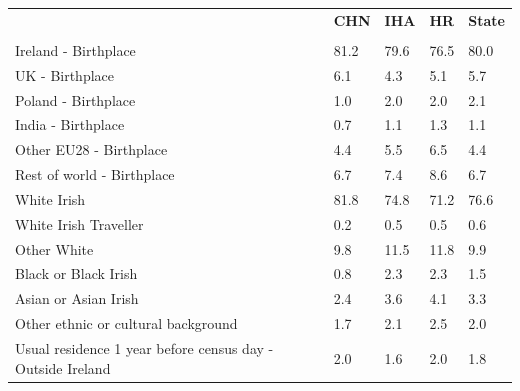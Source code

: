 \documentclass{article}
\begin{document}
\pagebreak
\begin{table}[h]	
\centering
		\begin{tabular}{KTTTT}
  \hline
& \textbf{CHN} & \textbf{IHA} & \textbf{HR}& \textbf{State}\\ 
  \hline
    \\ 
    \hline
Ireland - Birthplace & 81.2& 79.6& 76.5& 80.0\\
UK - Birthplace & 6.1& 4.3& 5.1& 5.7\\
Poland - Birthplace & 1.0& 2.0& 2.0& 2.1\\
India - Birthplace & 0.7& 1.1& 1.3& 1.1\\
Other EU28 - Birthplace & 4.4& 5.5& 6.5& 4.4\\
Rest of world - Birthplace & 6.7& 7.4& 8.6& 6.7\\
    \hline
White Irish & 81.8& 74.8& 71.2& 76.6\\
White Irish Traveller & 0.2& 0.5& 0.5& 0.6\\
Other White &  9.8& 11.5& 11.8&  9.9\\
Black or Black Irish & 0.8& 2.3& 2.3& 1.5\\
Asian or Asian Irish & 2.4& 3.6& 4.1& 3.3\\
Other ethnic or cultural background & 1.7& 2.1& 2.5& 2.0\\
    \hline
Usual residence 1 year before census day - Outside Ireland & 2.0& 1.6& 2.0& 1.8\\


\end{tabular}
\end{table}
\end{document}
